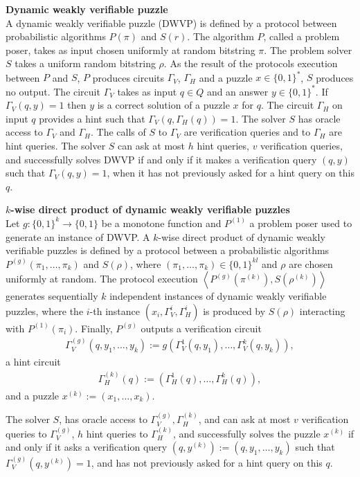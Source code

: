 \begin{definition} {\textbf{Dynamic weakly verifiable puzzle}}\\
  A dynamic weakly verifiable puzzle (DWVP) is defined by a protocol between probabilistic algorithms $P(\pi)$ and $S(r)$.
  The algorithm $P$, called a problem poser, takes as input chosen uniformly at random bitstring $\pi$.
  The problem solver $S$ takes a uniform random bitstring $\rho$.
  As the result of the protocols execution between $P$ and $S$,
  $P$ produces circuits $\Gamma_{V}$, $\Gamma_{H}$ and a puzzle $x \in \{0,1\}^{*}$, $S$ produces no output.
  The circuit $\Gamma_{V}$ takes as input $q \in Q$ and an answer $y \in \{0,1\}^*$.
  If $\Gamma_V(q,y) = 1$ then $y$ is a correct solution of a puzzle $x$ for $q$.
  The circuit $\Gamma_H$ on input $q$ provides a hint such that $\Gamma_V(q,\Gamma_H(q)) = 1$.
  The solver $S$ has oracle access to $\Gamma_V$ and $\Gamma_H$.
  The calls of $S$ to $\Gamma_V$ are verification queries and to $\Gamma_H$ are hint queries.
  The solver $S$ can ask at most $h$ hint queries, $v$ verification queries, and successfully solves DWVP if and only if
  it makes a verification query $(q,y)$ such that $\Gamma_V(q,y) = 1$, when it has not previously asked for a hint query on this $q$.
\end{definition}
%
\begin{definition}{\textbf{$k$-wise direct product of dynamic weakly verifiable puzzles}}\\
Let $g: \{0,1\}^{k} \rightarrow \{0,1\}$ be a monotone function and $P^{(1)}$ a problem poser used to generate an instance of DWVP.
A $k$-wise direct product of dynamic weakly verifiable puzzles is defined by a protocol between a probabilistic algorithms $P^{(g)}\left(\pi_1, \dots, \pi_k \right)$ and
$S(\rho)$, where $(\pi_1, \dots, \pi_k) \in \{0,1\}^{kl}$ and $\rho$ are chosen uniformly at random.
The protocol execution $\left\langle P^{(g)}\left(\pi^{(k)}\right), S(\rho^{(k)}) \right\rangle$ generates sequentially $k$ independent instances of dynamic weakly verifiable puzzles,
where the $i$-th instance $(x_i, \Gamma_V^{i}, \Gamma_H^{i} )$ is produced by $S(\rho)$ interacting with $P^{(1)}(\pi_i)$.
Finally, $P^{(g)}$ outputs a verification circuit
\begin{align*}
  \Gamma_V^{(g)} (q, y_1, \dots, y_k) := g(\Gamma_V^{1}(q, y_1), \dots, \Gamma_V^{k}(q, y_k)),
\end{align*}
a hint circuit
\begin{align*}
  \Gamma_H^{(k)} (q) := (\Gamma_H^{1}(q), \dots, \Gamma_H^{k}(q)),
\end{align*}
and a puzzle $x^{(k)} := (x_1, \dots, x_k)$.

The solver $S$, has oracle access to $\Gamma_V^{(g)}, \Gamma_H^{(k)}$, and
can ask at most $v$ verification queries to $\Gamma_V^{(g)}$, $h$ hint queries to $\Gamma_H^{(k)}$, and successfully solves the puzzle $x^{(k)}$
if and only if it asks a verification query $(q, y^{(k)}) := (q, y_1, \dots, y_k)$ such that $\Gamma_V^{(g)}(q, y^{(k)}) = 1$, and has not previously asked for a hint query on this $q$.
\end{definition}
